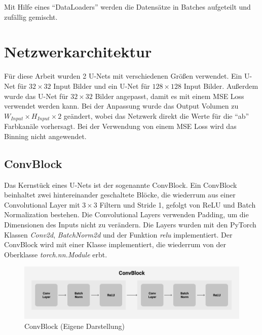 Mit Hilfe eines ``DataLoaders'' werden die Datensätze in Batches aufgeteilt und zufällig gemischt.

\section{Netzwerkarchitektur}
Für diese Arbeit wurden 2 U-Nets mit verschiedenen Größen verwendet. Ein U-Net für $ 32 \times 32 $ Input Bilder und ein U-Net für $ 128 \times 128 $
Input Bilder. Außerdem wurde das U-Net für $ 32 \times 32 $ Bilder angepasst, damit es mit einem MSE Loss verwendet werden kann. Bei der Anpassung wurde
das Output Volumen zu $ W_{Input} \times H_{Input} \times 2 $ geändert, wobei das Netzwerk direkt die Werte für die ``ab'' Farbkanäle vorhersagt.
Bei der Verwendung von einem MSE Loss wird das Binning nicht angewendet.

\subsection{ConvBlock}
Das Kernstück eines U-Nets ist der sogenannte ConvBlock. Ein ConvBlock beinhaltet zwei hintereinander geschaltete Blöcke, die wiederrum
aus einer Convolutional Layer mit $3 \times 3$ Filtern und Stride 1, gefolgt von ReLU und Batch Normalization bestehen.
Die Convolutional Layers verwenden Padding, um die Dimensionen des Inputs nicht zu verändern. Die Layers wurden mit den PyTorch
Klassen \textit{Conv2d}, \textit{BatchNorm2d} und der Funktion \textit{relu} implementiert. Der ConvBlock wird mit einer Klasse implementiert,
die wiederrum von der Oberklasse \textit{torch.nn.Module} erbt.

\begin{figure}[H]
  \centering
  \includegraphics[width=1\textwidth]{resources/networks/convblock.png}
  \caption{ConvBlock (Eigene Darstellung)}
  \label{image:convBlock}
\end{figure}

